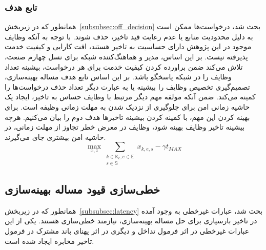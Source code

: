 \subsubsection{تابع هدف}
همانطور که در زیربخش~\ref{subsubsec:off_decision} بحث شد، درخواست‌ها ممکن است به دلیل محدودیت منابع یا عدم رعایت قید تاخیر، حذف شوند. با توجه به آنکه وظایف موجود در این پژوهش دارای حساسیت به تاخیر هستند، افت کارایی و کیفیت خدمت پذیرفته نیست. بر این اساس، مدیر و هماهنگ‌کننده شبکه  برای نسل چهارم صنعت، تلاش می‌کند ضمن براورده کردن کیفیت خدمت برای هر درخواست، بیشینه تعداد وظایف را در شبکه پاسخگو باشد. بر این اساس تابع هدف مساله بهینه‌سازی، تصمیم‌گیری تخصیص‌ وظایف را بیشینه یا به عبارت دیگر تعداد حذف درخواست‌ها را کمینه می‌کند. ضمن آنکه مولفه مهم دیگر مرتبط با وظایف حساس به تاخیر، ایجاد یک حاشیه زمانی امن برای جلوگیری از نزدیک شدن به مهلت زمانی وظیفه است. برای بهینه کردن این مهم، با کمینه کردن بیشینه تاخیرها هدف دوم را بیان می‌کنیم. هرچه بیشینه تاخیر وظایف بهینه شود، وظایف در معرض خطر تجاوز از مهلت زمانی، در حاشیه امن بیشتری جای می‌گیرند.
\begin{equation} \label{eq:goal_func}
    \max_{x,z} \sum_{\substack{k \in \mathbb{K}_e, e \in \mathbb{E}\\ s \in \mathbb{S}}} x_{k,e,s} - \gamma t_{MAX}
\end{equation}

\subsection{خطی‌سازی قیود مساله بهینه‌سازی}
همانطور که در زیربخش~\ref{subsubsec:latency} بحث شد، عبارات غیرخطی به وجود آمده در تاخیر بارسپاری برای حل مساله بهینه‌سازی، نیازمند خطی‌سازی هستند. یکی از این عبارات غیرخطی در اثر فرمول تداخل و دیگری در اثر پهنای باند مشترک در فرمول تاخیر مخابره ایجاد شده است.
